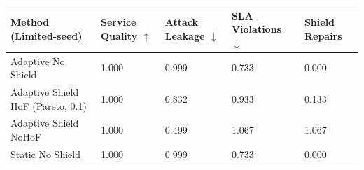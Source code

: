 \begin{tabular}{lllll}
\toprule
Method (Limited-seed) & Service Quality $\uparrow$ & Attack Leakage $\downarrow$ & SLA Violations $\downarrow$ & Shield Repairs \\
\midrule
Adaptive No Shield & 1.000 & 0.999 & 0.733 & 0.000 \\
Adaptive Shield HoF (Pareto, 0.1) & 1.000 & 0.832 & 0.933 & 0.133 \\
Adaptive Shield NoHoF & 1.000 & 0.499 & 1.067 & 1.067 \\
Static No Shield & 1.000 & 0.999 & 0.733 & 0.000 \\
\bottomrule
\end{tabular}
